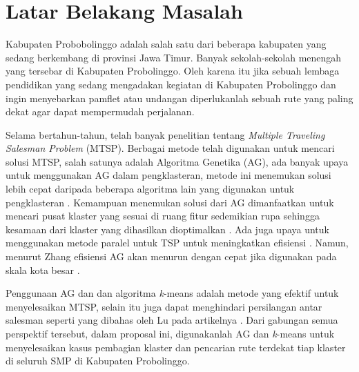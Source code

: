
\section{Latar Belakang Masalah}

Kabupaten Probobolinggo adalah salah satu dari beberapa kabupaten yang sedang berkembang di provinsi Jawa Timur. Banyak sekolah-sekolah menengah yang tersebar di Kabupaten Probolinggo. Oleh karena itu jika sebuah lembaga pendidikan yang sedang mengadakan kegiatan di Kabupaten Probolinggo dan ingin menyebarkan pamflet atau undangan diperlukanlah sebuah rute yang paling dekat agar dapat mempermudah perjalanan.

Selama bertahun-tahun, telah banyak penelitian tentang \textit{Multiple Traveling Salesman Problem} (MTSP). Berbagai metode telah digunakan untuk mencari solusi MTSP, salah satunya adalah Algoritma Genetika (AG), ada banyak upaya untuk menggunakan AG dalam pengklasteran, metode ini menemukan solusi lebih cepat daripada beberapa algoritma lain yang digunakan untuk pengklasteran \cite{krishna1999genetic}. Kemampuan menemukan solusi dari AG dimanfaatkan untuk mencari pusat klaster yang sesuai di ruang fitur sedemikian rupa sehingga kesamaan dari klaster yang dihasilkan dioptimalkan \cite{maii2000genetic}. Ada juga upaya untuk menggunakan metode paralel untuk TSP untuk meningkatkan efisiensi \cite{li2016parallel}. Namun, menurut Zhang efisiensi AG akan menurun dengan cepat jika digunakan pada skala kota besar \cite{zhang2014parallel}. 

Penggunaan AG dan dan algoritma \textit{k}-means adalah metode yang efektif untuk menyelesaikan MTSP, selain itu juga dapat menghindari persilangan antar salesman seperti yang dibahas oleh Lu pada artikelnya \cite{inproceedings}. Dari gabungan semua perspektif tersebut, dalam proposal ini, digunakanlah AG dan \textit{k}-means untuk menyelesaikan kasus pembagian klaster dan pencarian rute terdekat tiap klaster di seluruh SMP di Kabupaten Probolinggo.